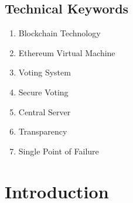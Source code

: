 \documentclass[oneside, 12pt]{book}
\begin{document}
		\subsection{Technical Keywords}
		\begin{enumerate}
			\item Blockchain Technology
			\item Ethereum Virtual Machine
			\item Voting System
			\item Secure Voting
			\item Central Server
			\item Transparency
			\item Single Point of Failure
		\end{enumerate}
	\newpage
	\section{Introduction}
	\newpage
\end{document}
